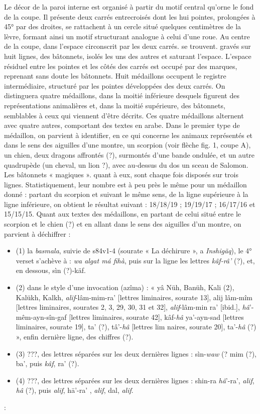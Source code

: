 Le décor de la paroi interne est organisé à partir du motif central qu'orne le fond de la coupe. Il présente deux carrés entrecroisés dont les hui pointes, prolongées à 45° par des droites, se rattachent à un cercle situé quelques centimètres de la lèvre, formant ainsi un motif structurant analogue à celui d'une roue. Au centre de la coupe, dans l'espace circonscrit par les deux carrés. se trouvent. gravés sur huit lignes, des bâtonnets, isolés les uns des autres et saturant l'espace. L'espace résiduel entre les pointes et les côtés des carrés est occupé par des marques, reprenant sans doute les bâtonnets. Huit médaillons occupent le registre intermédiaire, structuré par les pointes développées des deux carrés. On distinguera quatre médaillons, dans la moitié inférieure desquels figurent des représentations animalières et, dans la moitié supérieure, des bâtonnets, semblables à ceux qui viennent d'être décrits. Ces quatre médaillons alternent avec quatre autres, comportant des textes en arabe. Dans le premier type de médaillon, on parvient à identifier, en ce qui concerne les animaux représentés et dans le sens des aiguilles d'une montre, un scorpion (voir flèche fig. 1, coupe A), un chien, deux dragons affrontés (?), surmontés d'une bande ondulée, et un autre quadrupède (un cheval, un lion ?), avec au-dessus du dos un sceau de Salomon. Les bâtonnets « magiques ». quant à eux, sont chaque fois disposés sur trois lignes. Statistiquement, leur nombre est à peu près le même pour un médaillon donné : partant du scorpion et suivant le même sens, de la ligne supérieure à la ligne inférieure, on obtient le résultat suivant : 18/18/19 ; 19/19/17 ; 16/17/16 et 15/15/15. Quant aux textes des médaillons, en partant de celui situé entre le scorpion et le chien (?) et en allant dans le sens des aiguilles d'un montre, on parvient à déchiffrer :
\begin{itemize}
    \item (1) la \textit{basmala}, suivie de s84v1-4 (sourate « La déchirure », a
\textit{Inshigãq}), le 4° verset s'achève à : \textit{wa algat má fihà}, puis sur la ligne
les lettres \textit{kâf-râ'} (?), et, en dessous, sìn (?)-käf.
\item (2) dans le style d'une invocation (azîma) : « yâ Nüh, Banüh, Kali
(2), Kalükh, Kalkh, \textit{alif}-lâm-mim-ra' [lettres liminaires, sourate 13], alij lâm-mîm [lettres liminaires, sourates 2, 3, 29, 30, 31 et 32], \textit{alif}-lâm-min
ra' [ibid.], \textit{hâ}'-mêm-ayn-sîn-gaf [lettres liminaires, sourate 42], kâf-\textit{hâ}
ya'-ayn-sad [lettres liminaires, sourate 19], ta' (?), tâ'-\textit{hâ} [lettres lim naires, sourate 20], ta'-\textit{hâ} (?) », enfin dernière ligne, des chiffres (?).
\item (3) ???, des lettres séparées sur les deux dernières lignes : sìn-\textit{waw} (?
mim (?), ba', puis \textit{kâf}, ra' (?).
\item (4) ???, des lettres séparées sur les deux dernières lignes : shin-ra
\textit{hâ}'-ra', \textit{alif}, \textit{hâ} (?), puis \textit{alif}, hā'-ra' , \textit{alif}, dal, \textit{alif}.
\end{itemize}:


